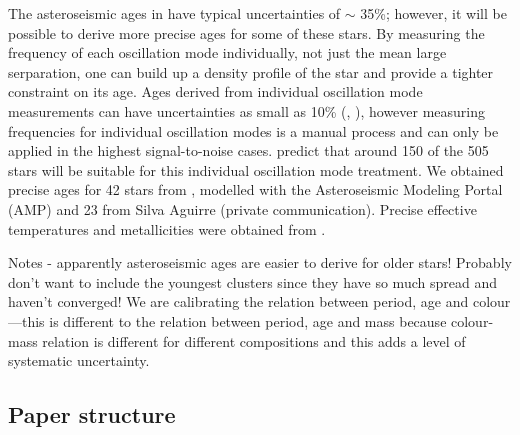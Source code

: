 \documentclass[10pt,preprint]{aastex}
\begin{document}
The asteroseismic ages in \citet{Chaplin2013} have typical uncertainties of $\sim$ 35\%; however, it will be possible to derive more precise ages for some of these stars.
By measuring the frequency of each oscillation mode individually, not just the mean large serparation, one can build up a density profile of the star and provide a tighter constraint on its age.
Ages derived from individual oscillation mode measurements can have uncertainties as small as 10\% (\citet{Brown1994}, \citet{SilvaAguirre2013}), however measuring frequencies for individual oscillation modes is a manual process and can only be applied in the highest signal-to-noise cases.
\citet{Chaplin2013} predict that around 150 of the 505 stars will be suitable for this individual oscillation mode treatment.
We obtained precise ages for 42 stars from \citet{Metcalfe2014}, modelled with the Asteroseismic Modeling Portal (AMP) and 23 from Silva Aguirre (private communication).
Precise effective temperatures and metallicities were obtained from \citet{Bruntt2012}.

Notes - apparently asteroseismic ages are easier to derive for older stars!
Probably don't want to include the youngest clusters since they have so much spread and haven't converged!
We are calibrating the relation between period, age and colour---this is different to the relation between period, age and mass because
colour-mass relation is different for different compositions and this adds a level of systematic uncertainty.

\subsection{Paper structure}



\end{document}
